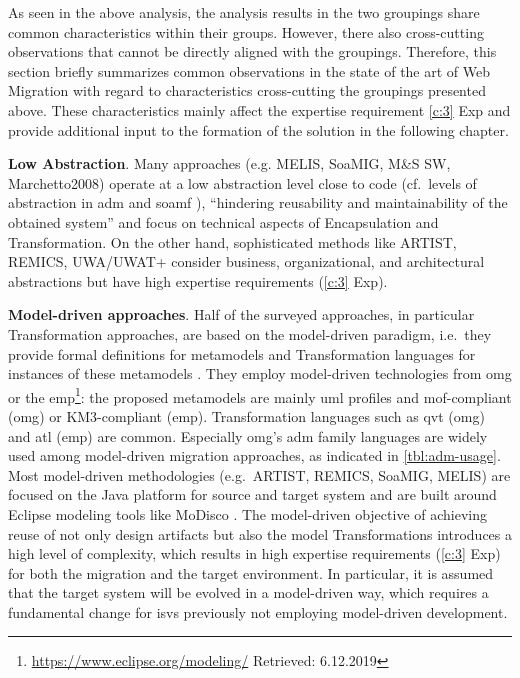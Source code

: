 As seen in the above analysis, the analysis results in the two groupings share common characteristics within their groups.
However, there also cross-cutting observations that cannot be directly aligned with the groupings.
Therefore, this section briefly summarizes common observations in the state of the art of \gls{Web Migration} with regard to characteristics cross-cutting the groupings presented above.
These characteristics mainly affect the expertise requirement \cref{c:3} Exp and provide additional input to the formation of the solution in the following chapter.

\textbf{Low Abstraction}. Many approaches (e.g.
MELIS, SoaMIG, M\&S SW, Marchetto2008) operate at a low abstraction level close to code (cf.~levels of abstraction in \gls{adm} and \gls{soamf} \autocite{Razavian2010SOA-MF}), ``hindering reusability and maintainability of the obtained system'' \autocite{Sosa2014MigraSOA} and focus on technical aspects of \gls{Encapsulation} and \gls{Transformation}.
On the other hand, sophisticated methods like ARTIST, REMICS, UWA/UWAT+ consider business, organizational, and architectural abstractions but have high expertise requirements (\cref{c:3} Exp).

\textbf{Model-driven approaches}. Half of the surveyed approaches, in particular \gls{Transformation} approaches, are based on the model-driven paradigm, i.e.~they provide formal definitions for \glspl{metamodel} and \gls{Transformation} languages for instances of these \glspl{metamodel} \autocite{Fuhr2013SOAMIG}.
They employ model-driven technologies from \gls{omg} or the \gls{emp}\footnote{\url{https://www.eclipse.org/modeling/} Retrieved: 6.12.2019}: the proposed \glspl{metamodel} are mainly \gls{uml} profiles and \gls{mof}-compliant (\gls{omg}) or KM3-compliant (\gls{emp}). 
\gls{Transformation} languages such as \gls{qvt} (\gls{omg}) and \gls{atl} (\gls{emp}) are common.
Especially \gls{omg}'s \gls{adm} family languages are widely used among model-driven migration approaches, as indicated in \cref{tbl:adm-usage}.
Most model-driven methodologies (e.g.~ARTIST, REMICS, SoaMIG, MELIS) are focused on the Java platform for source and \gls{target system} and are built around Eclipse modeling tools like MoDisco \autocite{Perez-Castillo2011Reengineering}.
The model-driven objective of achieving reuse of not only design \glspl{artifact} but also the model \glspl{Transformation} introduces a high level of complexity, which results in high expertise requirements (\cref{c:3} Exp) for both the migration and the target environment.
In particular, it is assumed that the \gls{target system} will be evolved in a model-driven way, which requires a fundamental change for \glspl{isv} previously not employing model-driven development.

